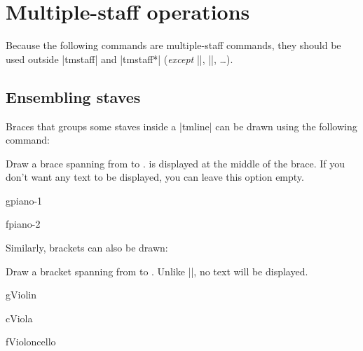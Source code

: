 \section{Multiple-staff operations}\label{sec:multistaff}
Because the following commands are multiple-staff commands, they should be 
used outside |{tmstaff}| and |{tmstaff*}| (\emph{except} 
|\tmbarlineinline|, |\tmdoublebarlineinline|, \dots).
\subsection{Ensembling staves}\label{sec:multistaff:ensemble-staves}
Braces that groups some staves inside a |{tmline}| can be drawn 
using the following command:
\begin{command}{\tmbrace{}}
  Draw a brace spanning from  to . 
   is displayed at the middle of the brace. If you don't want 
  any text to be displayed, you can leave this option empty.
\end{command}
\begin{codeexample}[]
\begin{tmline}[staff offset=2cm]%
\begin{tmstaff}{g}{piano-1}\end{tmstaff}%
\begin{tmstaff}{f}{piano-2}\end{tmstaff}%
%
\end{tmline}
\end{codeexample}
Similarly, brackets can also be drawn:
\begin{command}{\tmbracket{}}
  Draw a bracket spanning from  to . 
  Unlike |\tmbrace|, no text will be displayed.
\end{command}
\begin{codeexample}[]
\begin{tmline}[staff offset=2.5cm]%
\begin{tmstaff}{g}{Violin}\end{tmstaff}%
\begin{tmstaff}{c}{Viola}\end{tmstaff}%
\begin{tmstaff}{f}{Violoncello}\end{tmstaff}%
%
%
\end{tmline}
\end{codeexample}

